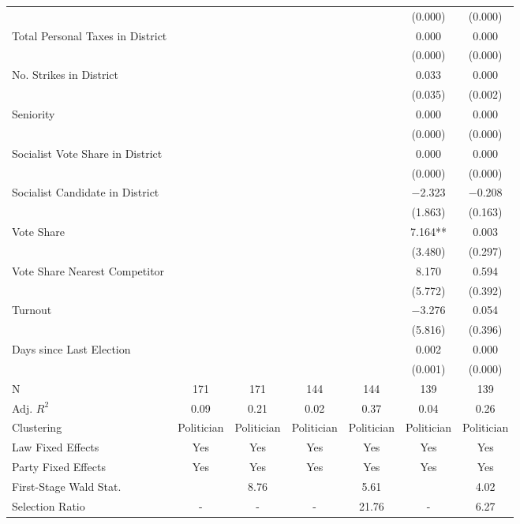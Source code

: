 \begin{table}[!h]
{\begin{threeparttable}
\begin{tabular}[t]{lcccccc}
 &  &  &  &  & (\num{0.000}) & \vphantom{3} (\num{0.000})\\
Total Personal Taxes in District &  &  &  &  & \num{0.000} & \num{0.000}\\
 &  &  &  &  & (\num{0.000}) & \vphantom{2} (\num{0.000})\\
No. Strikes in District &  &  &  &  & \num{0.033} & \num{0.000}\\
 &  &  &  &  & (\num{0.035}) & (\num{0.002})\\
Seniority &  &  &  &  & \num{0.000} & \num{0.000}\\
 &  &  &  &  & (\num{0.000}) & \vphantom{1} (\num{0.000})\\
Socialist Vote Share in District &  &  &  &  & \num{0.000} & \num{0.000}\\
 &  &  &  &  & (\num{0.000}) & (\num{0.000})\\
Socialist Candidate in District &  &  &  &  & \num{-2.323} & \num{-0.208}\\
 &  &  &  &  & (\num{1.863}) & (\num{0.163})\\
Vote Share &  &  &  &  & \num{7.164}** & \num{0.003}\\
 &  &  &  &  & (\num{3.480}) & (\num{0.297})\\
Vote Share Nearest Competitor &  &  &  &  & \num{8.170} & \num{0.594}\\
 &  &  &  &  & (\num{5.772}) & (\num{0.392})\\
Turnout &  &  &  &  & \num{-3.276} & \num{0.054}\\
 &  &  &  &  & (\num{5.816}) & (\num{0.396})\\
Days since Last Election &  &  &  &  & \num{0.002} & \num{0.000}\\
 &  &  &  &  & (\num{0.001}) & (\num{0.000})\\
\midrule
N & \num{171} & \num{171} & \num{144} & \num{144} & \num{139} & \num{139}\\
Adj. $R^2$ & \num{0.09} & \num{0.21} & \num{0.02} & \num{0.37} & \num{0.04} & \num{0.26}\\
Clustering & Politician & Politician & Politician & Politician & Politician & Politician\\
Law Fixed Effects & Yes & Yes & Yes & Yes & Yes & Yes\\
Party Fixed Effects & Yes & Yes & Yes & Yes & Yes & Yes\\
First-Stage Wald Stat. &  & 8.76 &  & 5.61 &  & 4.02\\
Selection Ratio & - & - & - & 21.76 & - & 6.27\\

\end{tabular}
\end{threeparttable}}
\end{table}
